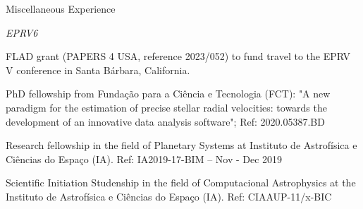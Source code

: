 
\begin{rubric}{Miscellaneous Experience}


\entry*[2024]  \textit{EPRV6} 

\entry*[2019]  



\entry*[\dates{2023/02}]
	FLAD grant (PAPERS 4 USA, reference 2023/052) to fund travel to the EPRV V conference in Santa Bárbara, California.

	PhD fellowship from Fundação para a Ciência e Tecnologia (FCT): "A new paradigm for the estimation of precise stellar radial velocities: towards the development of an innovative data analysis software"; Ref: 2020.05387.BD

\entry*[\dates{2019-11/2019-12}]
	Research fellowship in the field of Planetary Systems at Instituto de Astrofísica e Ciências do Espaço (IA).  Ref: IA2019-17-BIM -- Nov - Dec 2019 

\entry*[\dates{2019-04/2019-09}]
	Scientific Initiation Studenship  in the field of Computacional Astrophysics at the Instituto de Astrofísica e Ciências do Espaço (IA).  Ref: CIAAUP-11/x-BIC 


\end{rubric}